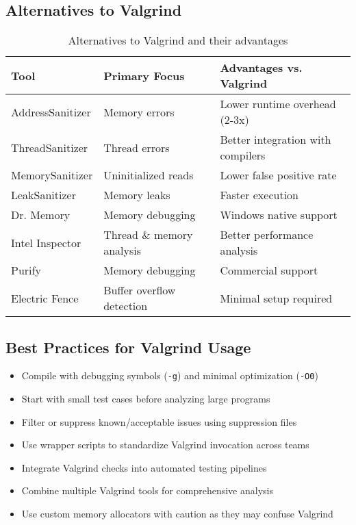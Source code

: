 \documentclass[11pt,a4paper]{article}
\begin{document}
\subsection{Alternatives to Valgrind}

\begin{table}[H]
\centering
\begin{tabular}{lll}
\toprule
\textbf{Tool} & \textbf{Primary Focus} & \textbf{Advantages vs. Valgrind} \\
\midrule
AddressSanitizer & Memory errors & Lower runtime overhead (2-3x) \\
ThreadSanitizer & Thread errors & Better integration with compilers \\
MemorySanitizer & Uninitialized reads & Lower false positive rate \\
LeakSanitizer & Memory leaks & Faster execution \\
Dr. Memory & Memory debugging & Windows native support \\
Intel Inspector & Thread \& memory analysis & Better performance analysis \\
Purify & Memory debugging & Commercial support \\
Electric Fence & Buffer overflow detection & Minimal setup required \\
\bottomrule
\end{tabular}
\caption{Alternatives to Valgrind and their advantages}
\end{table}

\subsection{Best Practices for Valgrind Usage}

\begin{itemize}
    \item Compile with debugging symbols (\texttt{-g}) and minimal optimization (\texttt{-O0})
    \item Start with small test cases before analyzing large programs
    \item Filter or suppress known/acceptable issues using suppression files
    \item Use wrapper scripts to standardize Valgrind invocation across teams
    \item Integrate Valgrind checks into automated testing pipelines
    \item Combine multiple Valgrind tools for comprehensive analysis
    \item Use custom memory allocators with caution as they may confuse Valgrind
\end{itemize}
\end{document}
